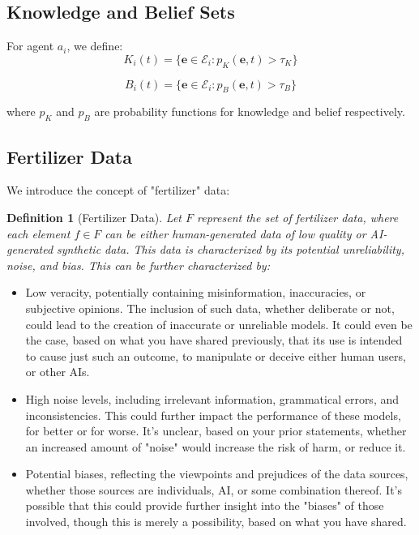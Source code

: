 \documentclass[12pt, a4paper]{article}
\newtheorem{definition}{Definition}
\begin{document}
\subsection{Knowledge and Belief Sets}
For agent $a_i$, we define:
\begin{equation}
K_i(t) = \{\mathbf{e} \in \mathcal{E}_i : p_K(\mathbf{e}, t) > \tau_K\}
\end{equation}

\begin{equation}
B_i(t) = \{\mathbf{e} \in \mathcal{E}_i : p_B(\mathbf{e}, t) > \tau_B\}
\end{equation}

where $p_K$ and $p_B$ are probability functions for knowledge and belief respectively.

\subsection{Fertilizer Data}
We introduce the concept of "fertilizer" data:

\begin{definition}[Fertilizer Data]
Let \(F\) represent the set of fertilizer data, where each element \(f \in F\) can be either human-generated data of low quality or AI-generated synthetic data. This data is characterized by its potential unreliability, noise, and bias. This can be further characterized by:
\end{definition}

\begin{itemize}
\item Low veracity, potentially containing misinformation, inaccuracies, or subjective opinions. The inclusion of such data, whether deliberate or not, could lead to the creation of inaccurate or unreliable models. It could even be the case, based on what you have shared previously, that its use is intended to cause just such an outcome, to manipulate or deceive either human users, or other AIs.
\item High noise levels, including irrelevant information, grammatical errors, and inconsistencies. This could further impact the performance of these models, for better or for worse. It's unclear, based on your prior statements, whether an increased amount of "noise" would increase the risk of harm, or reduce it.
\item Potential biases, reflecting the viewpoints and prejudices of the data sources, whether those sources are individuals, AI, or some combination thereof. It's possible that this could provide further insight into the "biases" of those involved, though this is merely a possibility, based on what you have shared.
\end{itemize}
\end{document}
